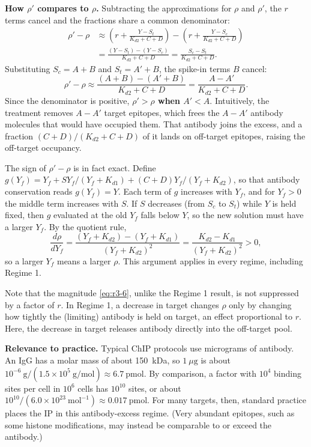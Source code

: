 \textbf{How $\rho'$ compares to $\rho$.} Subtracting the approximations
for $\rho$ and $\rho'$, the $r$ terms cancel and the fractions share a
common denominator:
$$\begin{aligned}
\rho'-\rho
&\approx\left(r+\frac{Y-S_t}{K_{d2}+C+D}\right)
-\left(r+\frac{Y-S_c}{K_{d2}+C+D}\right) \\
&=\frac{(Y-S_t)-(Y-S_c)}{K_{d2}+C+D}
=\frac{S_c-S_t}{K_{d2}+C+D}.
\end{aligned}$$
Substituting $S_c=A+B$ and $S_t=A'+B$, the spike-in terms $B$ cancel:
\begin{equation}
\rho'-\rho\approx\frac{(A+B)-(A'+B)}{K_{d2}+C+D}
=\frac{A-A'}{K_{d2}+C+D}.
\label{eq:r3-6}
\end{equation}
Since the denominator is positive, \textbf{$\rho'>\rho$ when $A'<A$}.
Intuitively, the treatment removes $A-A'$ target epitopes, which frees
the $A-A'$ antibody molecules that would have occupied them. That
antibody joins the excess, and a fraction $(C+D)/(K_{d2}+C+D)$ of it
lands on off-target epitopes, raising the off-target occupancy.

The sign of $\rho'-\rho$ is in fact exact. Define
$g(Y_f)=Y_f+SY_f/(Y_f+K_{d1})+(C+D)Y_f/(Y_f+K_{d2})$, so that antibody
conservation reads $g(Y_f)=Y$. Each term of $g$ increases with $Y_f$,
and for $Y_f>0$ the middle term increases with $S$. If $S$ decreases
(from $S_c$ to $S_t$) while $Y$ is held fixed, then $g$ evaluated at the
old $Y_f$ falls below $Y$, so the new solution must have a larger $Y_f$.
By the quotient rule,
$$
\frac{d\rho}{dY_f}
=\frac{(Y_f+K_{d2})-(Y_f+K_{d1})}{(Y_f+K_{d2})^2}
=\frac{K_{d2}-K_{d1}}{(Y_f+K_{d2})^2}>0,
$$
so a larger $Y_f$ means a larger $\rho$. This argument applies in every
regime, including Regime 1.

Note that the magnitude \eqref{eq:r3-6}, unlike the Regime 1 result, is
not suppressed by a factor of $r$. In Regime 1, a decrease in target
changes $\rho$ only by changing how tightly the (limiting) antibody is
held on target, an effect proportional to $r$. Here, the decrease in
target releases antibody directly into the off-target pool.

\textbf{Relevance to practice.} Typical ChIP protocols use micrograms of
antibody. An IgG has a molar mass of about 150~kDa, so
$1~\mu\mathrm{g}$ is about
$10^{-6}~\mathrm{g}/(1.5\times10^{5}~\mathrm{g/mol})\approx6.7~\mathrm{pmol}$.
By comparison, a factor with $10^4$ binding sites per cell in $10^6$ cells
has $10^{10}$ sites, or about
$10^{10}/(6.0\times10^{23}~\mathrm{mol}^{-1})\approx0.017~\mathrm{pmol}$.
For many targets, then, standard practice places the IP in this
antibody-excess regime. (Very abundant epitopes, such as some histone
modifications, may instead be comparable to or exceed the antibody.)

